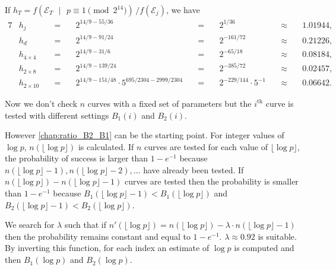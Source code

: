 \documentclass[a4paper, 11pt, pdftex]{report}
\theoremstyle{plain}
\theoremstyle{definition}
\begin{document}
If $h_T = f(\mathcal{E}_T \text{ }|\text{ } p \equiv 1 \pmod{2^{14}})\, / f(\mathcal{E}_j)$, we have
\begin{alignat*}{7}
&h_j           \quad &=& \quad 2^{14/9 - 55/36}  \quad &=& \quad 2^{1/36}    \quad &\approx& \quad 1.01944,\\
&h_d           \quad &=& \quad 2^{14/9 - 91/24}  \quad &=& \quad 2^{-161/72} \quad &\approx& \quad 0.21226,\\
&h_{4\times4}  \quad &=& \quad 2^{14/9 - 31/6}   \quad &=& \quad 2^{-65/18}  \quad &\approx& \quad 0.08184,\\
&h_{2\times8}  \quad &=& \quad 2^{14/9 - 139/24} \quad &=& \quad 2^{-385/72} \quad &\approx& \quad 0.02457,\\
&h_{2\times10} \quad &=& \quad 2^{14/9 - 151/48}\cdot 5^{695/2304 - 2999/2304} \quad &=& \quad 2^{-229/144}\cdot 5^{-1} \quad &\approx& \quad 0.06642.
\end{alignat*}

 Now we don't check $n$ curves with a fixed set of
parameters but the $i^\text{th}$ curve is tested with different settings
$B_1(i)$ and $B_2(i)$.

However \autoref{chap:ratio_B2_B1} can be the starting point. For integer values of $\log p$,
$n(\lfloor\log p\rfloor)$ is calculated. If $n$ curves are tested for each value of
$\lfloor\log p\rfloor$, the probability of success is larger than $1 - e^{-1}$ because
$n(\lfloor\log p\rfloor - 1), n(\lfloor\log p\rfloor - 2), \ldots$ have already been tested.
If $n(\lfloor\log p\rfloor) - n(\lfloor\log p\rfloor - 1)$ curves are tested then
the probability is smaller than $1 - e^{-1}$ because
$B_1(\lfloor\log p\rfloor - 1) < B_1(\lfloor\log p\rfloor)$ and
$B_2(\lfloor\log p\rfloor - 1) < B_2(\lfloor\log p\rfloor)$.

We search for $\lambda$ such that if
$n'(\lfloor\log p\rfloor) = n(\lfloor\log p\rfloor) - \lambda \cdot n(\lfloor\log p\rfloor - 1)$
then the probability remains constant and equal to $1 - e^{-1}$. $\lambda \approx 0.92$ is
suitable. By inverting this function, for each index an estimate of $\log p$ is computed and
then $B_1(\log p)$ and $B_2(\log p)$.
\end{document}
